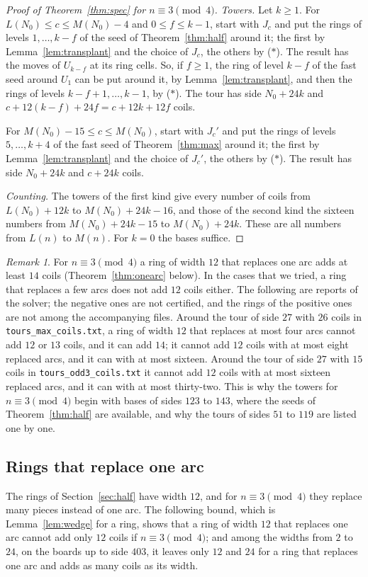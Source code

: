 \documentclass[11pt]{amsart}
\theoremstyle{remark}
\newtheorem{remark}[theorem]{Remark}
\begin{document}
\begin{proof}[Proof of Theorem~\ref{thm:spec} for $n\equiv3\pmod 4$]
\emph{Towers.} Let $k\ge1$. For $L(N_0)\le c\le M(N_0)-4$ and $0\le f\le k-1$, start with $J_c$ and put the rings of
levels $1,\dots,k-f$ of the seed of Theorem~\ref{thm:half} around it; the first by Lemma~\ref{lem:transplant} and
the choice of $J_c$, the others by ($*$). The result has the moves of $U_{k-f}$ at its ring cells. So, if $f\ge1$,
the ring of level $k-f$ of the fast seed around $U_1$ can be put around it, by Lemma~\ref{lem:transplant}, and then
the rings of levels $k-f+1,\dots,k-1$, by ($*$). The tour has side $N_0+24k$ and $c+12(k-f)+24f=c+12k+12f$ coils.

For $M(N_0)-15\le c\le M(N_0)$, start with $J_c'$ and put the rings of levels $5,\dots,k+4$ of the fast seed of
Theorem~\ref{thm:max} around it; the first by Lemma~\ref{lem:transplant} and the choice of $J_c'$, the others by
($*$). The result has side $N_0+24k$ and $c+24k$ coils.

\emph{Counting.} The towers of the first kind give every number of coils from $L(N_0)+12k$ to $M(N_0)+24k-16$, and
those of the second kind the sixteen numbers from $M(N_0)+24k-15$ to $M(N_0)+24k$. These are all numbers from
$L(n)$ to $M(n)$. For $k=0$ the bases suffice.
\end{proof}

\begin{remark}\label{rem:spec3}
For $n\equiv3\pmod 4$ a ring of width $12$ that replaces one arc adds at least $14$ coils
(Theorem~\ref{thm:onearc} below). In the cases that we tried, a ring that replaces a few arcs
does not add $12$ coils either. The following are reports of the solver; the negative ones are not certified, and
the rings of the positive ones are not among the accompanying files. Around the tour of side $27$ with $26$ coils in
\texttt{tours\_max\_coils.txt}, a ring of width $12$ that replaces at most four arcs cannot add $12$ or $13$ coils,
and it can add $14$; it cannot add $12$ coils with at most eight replaced arcs, and it can with at most sixteen.
Around the tour of side $27$ with $15$ coils in \texttt{tours\_odd3\_coils.txt} it cannot add $12$ coils with at most
sixteen replaced arcs, and it can with at most thirty-two. This is why the towers for $n\equiv3\pmod 4$ begin with
bases of sides $123$ to $143$, where the seeds of Theorem~\ref{thm:half} are available, and why the tours of sides
$51$ to $119$ are listed one by one.
\end{remark}

\subsection*{Rings that replace one arc}
The rings of Section~\ref{sec:half} have width $12$, and for $n\equiv3\pmod 4$ they replace many pieces instead of
one arc. The following bound, which is Lemma~\ref{lem:wedge} for a ring, shows that a ring of width $12$ that replaces
one arc cannot add only $12$ coils if $n\equiv3\pmod 4$; and among the widths from $2$ to $24$, on the boards up to
side $403$, it leaves only $12$ and $24$ for a ring that replaces one arc and adds as many coils as its width.
\end{document}
